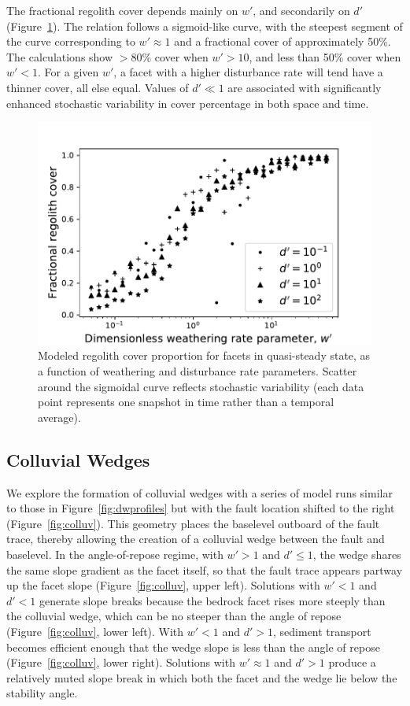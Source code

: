The fractional regolith cover depends mainly on $w'$, and secondarily on $d'$ (Figure~\ref{fig:regw}). The relation follows a sigmoid-like curve, with the steepest segment of the curve corresponding to $w'\approx 1$ and a fractional cover of approximately 50\%. The calculations show $>$80\% cover when $w'>10$, and less than 50\% cover when $w'<1$. For a given $w'$, a facet with a higher disturbance rate will tend have a thinner cover, all else equal. Values of $d'\ll1$ are associated with significantly enhanced stochastic variability in cover percentage in both space and time.

\begin{figure}[ht!]
\centerline{\includegraphics{figure11.pdf}}
\caption{Modeled regolith cover proportion for facets in quasi-steady state, as a function of weathering and disturbance rate parameters. Scatter around the sigmoidal curve reflects stochastic variability (each data point represents one snapshot in time rather than a temporal average).}
\label{fig:regw}
\end{figure}


\subsection{Colluvial Wedges}

We explore the formation of colluvial wedges with a series of model runs similar to those in Figure~\ref{fig:dwprofiles} but with the fault location shifted to the right (Figure~\ref{fig:colluv}). This geometry places the baselevel outboard of the fault trace, thereby allowing the creation of a colluvial wedge between the fault and baselevel. In the angle-of-repose regime, with $w'>1$ and $d'\le 1$, the wedge shares the same slope gradient as the facet itself, so that the fault trace appears partway up the facet slope (Figure~\ref{fig:colluv}, upper left). Solutions with $w'<1$ and $d'<1$ generate slope breaks because the bedrock facet rises more steeply than the colluvial wedge, which can be no steeper than the angle of repose (Figure~\ref{fig:colluv}, lower left). With $w'<1$ and $d' > 1$, sediment transport becomes efficient enough that the wedge slope is less than the angle of repose  (Figure~\ref{fig:colluv}, lower right). Solutions with $w' \approx 1$ and $d'>1$ produce a relatively muted slope break in which both the facet and the wedge lie below the stability angle.

